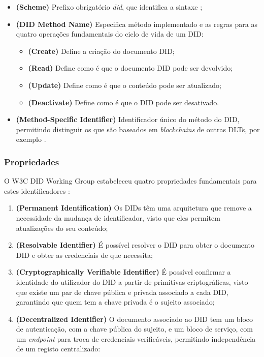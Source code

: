 \begin{itemize}
    \item \textbf{(Scheme)} Prefixo obrigatório \textit{did}, que identifica a sintaxe \cite{w3c_did_spec};
    \item \textbf{(DID Method Name)} Especifica método implementado e as regras para as quatro operações fundamentais do ciclo de vida de um DID:
    \begin{itemize}
        \item \textbf{(Create)} Define a criação do documento DID;
        \item \textbf{(Read)} Define como é que o documento DID pode ser devolvido;
        \item \textbf{(Update)} Define como é que o conteúdo pode ser atualizado;
        \item \textbf{(Deactivate)} Define como é que o DID pode ser desativado.
    \end{itemize}
    \item \textbf{(Method-Specific Identifier)} Identificador único do método do DID, permitindo distinguir os que são baseados em \textit{blockchains} de outras DLTs, por exemplo \cite{preukschat2021self}.
\end{itemize}

\subsubsection{Propriedades}

O W3C DID Working Group estabeleceu quatro propriedades fundamentais para estes identificadores \cite{preukschat2021self}:

\begin{enumerate}
    \item \textbf{(Permanent Identification)} Os DIDs têm uma arquitetura que remove a necessidade da mudança de identificador, visto que eles permitem atualizações do seu conteúdo;
    \item \textbf{(Resolvable Identifier)} É possível resolver o DID para obter o documento DID e obter as credenciais de que necessita;
    \item \textbf{(Cryptographically Verifiable Identifier)} É possível confirmar a identidade do utilizador do DID a partir de primitivas criptográficas, visto que existe um par de chave pública e privada associado a cada DID, garantindo que quem tem a chave privada é o sujeito associado;
    \item \textbf{(Decentralized Identifier)} O documento associado ao DID tem um bloco de autenticação, com a chave pública do sujeito, e um bloco de serviço, com um \textit{endpoint} para troca de credenciais verificáveis, permitindo independência de um registo centralizado:
\end{enumerate}

